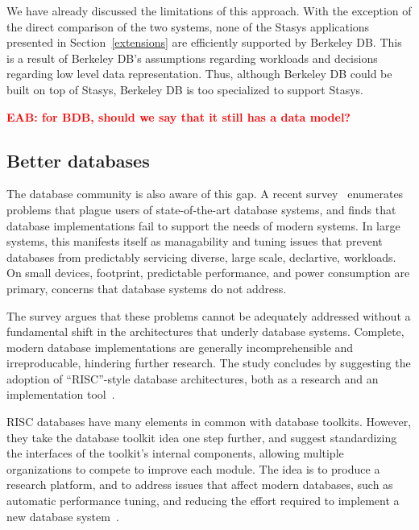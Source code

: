 \documentclass[letterpaper,twocolumn,10pt]{article}
\newcommand{\yad}{Stasys\xspace}
\newcommand{\eab}[1]{\textcolor{red}{\bf EAB: #1}}
\begin{document}
We have already discussed the limitations of this approach.  With the
exception of the direct comparison of the two systems, none of the \yad 
applications presented in Section~\ref{extensions} are efficiently
supported by Berkeley DB.   This is a result of Berkeley DB's  
assumptions regarding workloads and decisions regarding low level data
representation.  Thus, although Berkeley DB could be built on top of \yad,
Berkeley DB is too specialized to support \yad.

\eab{for BDB, should we say that it still has a data model?}




\subsection{Better databases}

The database community is also aware of this gap. 
A recent survey~\cite{riscDB} enumerates problems that plague users of
state-of-the-art database systems, and finds that database implementations fail to support the
needs of modern systems.  In large systems, this manifests itself as
managability and tuning issues that prevent databases from predictably
servicing diverse, large scale, declartive, workloads.  
On small devices, footprint, predictable performance, and power consumption are
primary, concerns that database systems do not address.


The survey argues that these problems cannot be adequately addressed without a fundamental shift in the architectures that underly database systems.  Complete, modern database
implementations are generally incomprehensible and
irreproducable, hindering further research.  The study concludes 
by suggesting the adoption of ``RISC''-style database architectures, both as a research and an
implementation tool~\cite{riscDB}.  

RISC databases have many elements in common with
database toolkits.  However, they take the database toolkit idea one
step further, and suggest standardizing the interfaces of the
toolkit's internal components, allowing multiple organizations to
compete to improve each module.  The idea is to produce a research
platform, and to address issues that affect modern
databases, such as automatic performance tuning, and reducing the
effort required to implement a new database system~\cite{riscDB}.
\end{document}
